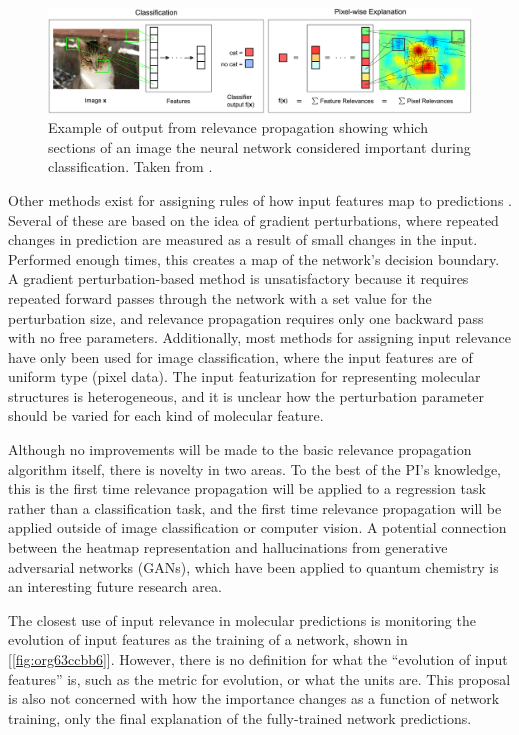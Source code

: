 \documentclass[12pt]{article}
\begin{document}
\begin{figure}[htbp]
\centering
\includegraphics[width=.9\linewidth]{2-Figure1-1.png}
\caption{\label{fig:org277271b}
Example of output from relevance propagation showing which sections of an image the neural network considered important during classification. Taken from \parencite{10.1371/journal.pone.0130140}.}
\end{figure}

Other methods exist for assigning rules of how input features map to predictions \cite{Finnegan105957,2017arXiv170303717S,2016arXiv161107478L}. Several of these are based on the idea of gradient perturbations, where repeated changes in prediction are measured as a result of small changes in the input. Performed enough times, this creates a map of the network's decision boundary\cite{wiki:db}. A gradient perturbation-based method is unsatisfactory because it requires repeated forward passes through the network with a set value for the perturbation size, and relevance propagation requires only one backward pass with no free parameters. Additionally, most methods for assigning input relevance have only been used for image classification, where the input features are of uniform type (pixel data). The input featurization for representing molecular structures\cite{2017arXiv170205532F} is heterogeneous, and it is unclear how the perturbation parameter should be varied for each kind of molecular feature.

Although no improvements will be made to the basic relevance propagation algorithm itself, there is novelty in two areas. To the best of the PI's knowledge, this is the first time relevance propagation will be applied to a regression task rather than a classification task, and the first time relevance propagation will be applied outside of image classification or computer vision. A potential connection between the heatmap representation and hallucinations from generative adversarial networks (GANs), which have been applied to quantum chemistry \cite{doi:10.1063/1.4973380} is an interesting future research area.

The closest use of input relevance in molecular predictions is monitoring the evolution of input features as the training of a network\cite{Kearnes2016}, shown in [\ref{fig:org63ccbb6}]. However, there is no definition for what the ``evolution of input features'' is, such as the metric for evolution, or what the units are. This proposal is also not concerned with how the importance changes as a function of network training, only the final explanation of the fully-trained network predictions.
\end{document}
